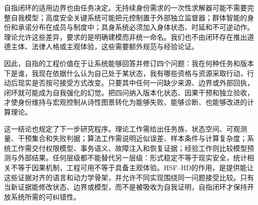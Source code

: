 自指闭环的适用边界也由任务决定。无持续身份需求的一次性求解器可能不需要完整自我模型；高度安全关键系统可能把元控制置于外部独立监督器；群体智能的身份和承诺分布在成员与制度中；具身系统必须加入身体状态、时延和不可逆动作。理论允许这些差异，要求的是明确建模而非统一命名。我们也不由闭环存在推出道德主体、法律人格或主观体验，这些需要额外规范与经验论证。

因此，自指的工程价值在于让系统能够回答并修订四个问题：我在何种任务和版本下是谁，我现在依据什么认为自己处于某状态，我有哪些资格与资源采取行动，行动后现实是否按可接受方式改变。只要其中任何一问缺少来源、边界或外部回执，闭环就可能成为自我强化的幻觉。把四问纳入版本化状态、因果干预和独立验收，才使身份维持与宏观控制从诗性图景转化为能够失败、能够诊断、也能够改进的计算理论。

这一结论也规定了下一步研究程序。理论工作需给出任务族、状态空间、可观测量、干预集合和失败判据；算法工作需说明近似误差、样本条件与计算复杂度；系统工作需交付权限模型、事务语义、故障注入和恢复证据；经验工作则比较模型预测与外部结果。任何层级都不能替代另一层级：形式稳定不等于现实安全，统计相关不等于因果机制，工程可用不等于具备主观体验。HSF--HD的作用，是提供能让这些证据对齐的语言和动力学骨架，并允许不同实现围绕同一问题接受比较。只有当新证据能修改状态、边界或模型，而不是被吸收为自我证明，自指闭环才保持开放系统所需的可纠错性。

